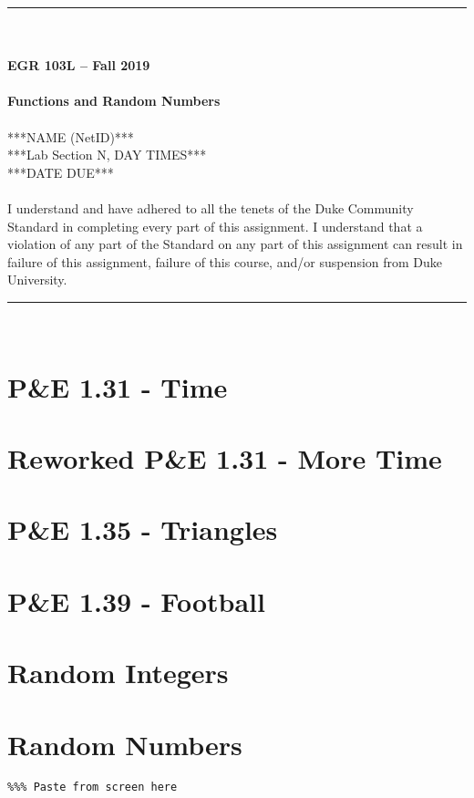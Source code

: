 \documentclass{article}
\begin{document}
\begin{center}
\rule{6.5in}{0.5mm}\\~\\
\textbf{\large EGR 103L -- Fall 2019}\\~\\
\textbf{\huge Functions and Random Numbers}\\~\\
***NAME (NetID)***\\
***Lab Section N, DAY TIMES***\\
***DATE DUE***\\~\\
{\small I understand and have adhered to all the tenets of the Duke
  Community Standard in completing every part of this assignment.  I
  understand that a violation of any part of the Standard on any part
  of this assignment can result in failure of this assignment, failure
  of this course, and/or suspension from Duke University.} 
\rule{6.5in}{0.5mm}\\
\end{center}
\tableofcontents
\listoffigures
\pagebreak

\section{P\&E 1.31 - Time}

\section{Reworked P\&E 1.31 - More Time}

\section{P\&E 1.35 - Triangles}

\section{P\&E 1.39 - Football}

\clearpage

\section{Random Integers}

\section{Random Numbers}
\begin{lstlisting}
%%% Paste from screen here
\end{lstlisting}
\end{document}
